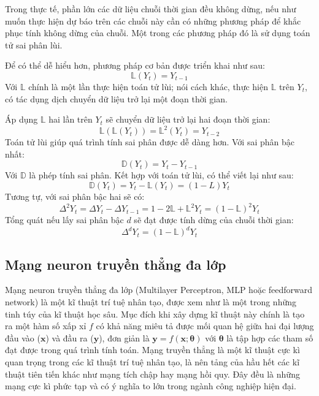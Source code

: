 \documentclass[12pt,a4paper]{report}
\begin{document}
Trong thực tế, phần lớn các dữ liệu chuỗi thời gian đều không dừng, nếu như muốn thực hiện dự báo trên các chuỗi này cần có những phương pháp để khắc phục tính không dừng của chuỗi. Một trong các phương pháp đó là sử dụng toán tử sai phân lùi.

Để có thể dễ hiểu hơn, phương pháp cơ bản được triển khai như sau:
	\begin{equation}
		\mathbb{L}(Y_t) = Y_{t-1}
	\end{equation}
Với $\mathbb{L}$ chính là một lần thực hiện toán tử lùi; nói cách khác, thực hiện $\mathbb{L}$ trên $Y_t$, có tác dụng dịch chuyển dữ liệu trở lại một đoạn thời gian.

Áp dụng $\mathbb{L}$ hai lần trên $Y_t$ sẽ chuyển dữ liệu trở lại hai đoạn thời gian:
	\begin{equation}
		\mathbb{L}(\mathbb{L}(Y_t)) = \mathbb{L}^2(Y_t) = Y_{t-2}
	\end{equation}
Toán tử lùi giúp quá trình tính sai phân được dễ dàng hơn. Với sai phân bậc nhất:
	\begin{equation}
		\mathbb{D}(Y_t) = Y_t - Y_{t-1}
	\end{equation}
Với $\mathbb{D}$ là phép tính sai phân. Kết hợp với toán tử lùi, có thể viết lại như sau:
	\begin{equation}
		\mathbb{D}(Y_t) = Y_t - \mathbb{L}(Y_t) = (1 - L)Y_t
	\end{equation}
Tương tự, với sai phân bậc hai sẽ có:
	\begin{equation}
		\Delta^2Y_t = \Delta Y_t - \Delta Y_{t-1} = 1-2\mathbb{L}+\mathbb{L}^2 Y_t = (1 - \mathbb{L})^2Y_t
	\end{equation}
Tổng quát nếu lấy sai phân bậc $d$ sẽ đạt được tính dừng của chuỗi thời gian:
	\begin{equation}
		\Delta^dY_t = (1 - \mathbb{L})^dY_t
	\end{equation}

\subsection{Mạng neuron truyền thẳng đa lớp}
Mạng neuron truyền thẳng đa lớp (Multilayer Perceptron, MLP hoặc feedforward network) là một kĩ thuật trí tuệ nhân tạo, được xem như là một trong những tinh túy của kĩ thuật học sâu. Mục đích khi xây dựng kĩ thuật này chính là tạo ra một hàm số xấp xỉ $f$ có khả năng miêu tả được mối quan hệ giữa hai đại lượng đầu vào ($\textbf{x}$) và đầu ra ($\textbf{y}$), đơn giản là $\mathbf{y} = f(\mathbf{x}; \mathbf{\theta})$ với $\mathbf{\theta}$ là tập hợp các tham số đạt được trong quá trình tính toán. Mạng truyền thẳng là một kĩ thuật cực kì quan trọng trong các kĩ thuật trí tuệ nhân tạo, là nên tảng của hầu hết các kĩ thuật tiên tiến khác như mạng tích chập hay mạng hồi quy. Đây đều là những mạng cực kì phức tạp và có ý nghĩa to lớn trong ngành công nghiệp hiện đại.
\end{document}
